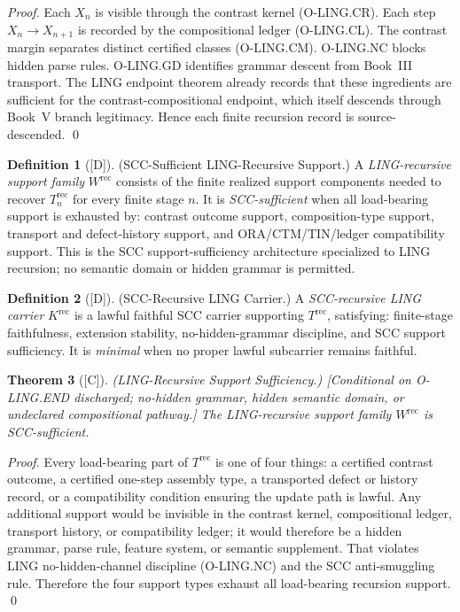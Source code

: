 \documentclass[12pt,oneside]{amsbook}
\theoremstyle{plain}
\newtheorem{theorem}{Theorem}[section]
\theoremstyle{definition}
\newtheorem{definition}[theorem]{Definition}
\theoremstyle{remark}
\newcommand{\status}[1]{\textup{[#1]}}
\begin{document}
\begin{proof}
Each $X_n$ is visible through the contrast kernel (O-LING.CR). Each
step $X_n \to X_{n+1}$ is recorded by the compositional ledger
(O-LING.CL). The contrast margin separates distinct certified classes
(O-LING.CM). O-LING.NC blocks hidden parse rules. O-LING.GD
identifies grammar descent from Book~III transport. The LING endpoint
theorem already records that these ingredients are sufficient for the
contrast-compositional endpoint, which itself descends through Book~V
branch legitimacy. Hence each finite recursion record is
source-descended.
\qed
\end{proof}

\begin{definition}[\status{D}]\label{def:ling-rec-support}
\textup{(SCC-Sufficient LING-Recursive Support.)}
A \emph{LING-recursive support family} $W^{\mathrm{rec}}$ consists
of the finite realized support components needed to recover $T_n^{\mathrm{rec}}$
for every finite stage $n$. It is \emph{SCC-sufficient} when all
load-bearing support is exhausted by:
contrast outcome support,
composition-type support,
transport and defect-history support, and
ORA/CTM/TIN/ledger compatibility support.
This is the SCC support-sufficiency architecture specialized to LING
recursion; no semantic domain or hidden grammar is permitted.
\end{definition}

\begin{definition}[\status{D}]\label{def:ling-rec-carrier}
\textup{(SCC-Recursive LING Carrier.)}
A \emph{SCC-recursive LING carrier} $K^{\mathrm{rec}}$ is a lawful
faithful SCC carrier supporting $T^{\mathrm{rec}}$, satisfying:
finite-stage faithfulness, extension stability, no-hidden-grammar
discipline, and SCC support sufficiency. It is \emph{minimal} when
no proper lawful subcarrier remains faithful.
\end{definition}

\begin{theorem}[\status{C}]\label{thm:ling-rec-support-sufficiency}
\textup{(LING-Recursive Support Sufficiency.)}
\textup{[Conditional on O-LING.END discharged; no-hidden grammar,
hidden semantic domain, or undeclared compositional pathway.]}
The LING-recursive support family $W^{\mathrm{rec}}$ is SCC-sufficient.
\end{theorem}

\begin{proof}
Every load-bearing part of $T^{\mathrm{rec}}$ is one of four things:
a certified contrast outcome,
a certified one-step assembly type,
a transported defect or history record, or
a compatibility condition ensuring the update path is lawful.
Any additional support would be invisible in the contrast kernel,
compositional ledger, transport history, or compatibility ledger; it
would therefore be a hidden grammar, parse rule, feature system, or
semantic supplement. That violates LING no-hidden-channel discipline
(O-LING.NC) and the SCC anti-smuggling rule. Therefore the four
support types exhaust all load-bearing recursion support.
\qed
\end{proof}
\end{document}
